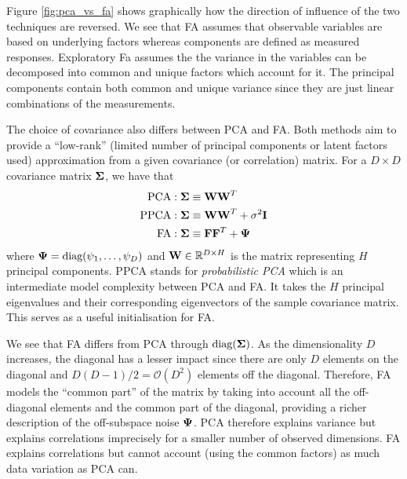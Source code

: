 \documentclass[12pt, letterpaper]{article}
\begin{document}
    Figure \ref{fig:pca_vs_fa} shows graphically how the direction of influence of the two techniques are reversed. We see that FA assumes that observable variables are based on underlying factors whereas components are defined as measured responses. 
    Exploratory Fa assumes the the variance in the variables can be decomposed into common and unique factors which account for it. The principal components contain both common and unique variance since they are just linear combinations of the measurements.

    The choice of covariance also differs between PCA and FA. Both methods aim to provide a ``low-rank'' (limited number of principal components or latent factors used) approximation from a given covariance (or correlation) matrix. For a $D\times D$ covariance matrix $\vb{\Sigma}$, we have that 
    \begin{align*}
        \text{PCA} &: \vb{\Sigma}\equiv \vb{WW}^T \\
        \text{PPCA} &: \vb{\Sigma}\equiv \vb{WW}^T + \sigma^2\vb{I} \\
        \text{FA} &: \vb{\Sigma}\equiv \vb{FF}^T+\vb{\Psi}
    \end{align*}
    where $\vb{\Psi}=\text{diag}(\psi_1,\dots,\psi_D)$ and $\vb{W}\in\mathbb{R}^{D\times H}$ is the matrix representing $H$ principal components. PPCA stands for \emph{probabilistic PCA} which is an intermediate model complexity between PCA and FA. It takes the $H$ principal eigenvalues and their corresponding eigenvectors of the sample covariance matrix. This serves as a useful initialisation for FA.
    
    We see that FA differs from PCA through $\text{diag}(\vb{\Sigma})$. As the dimensionality $D$ increases, the diagonal has a lesser impact since there are only $D$ elements on the diagonal and $D(D-1)/2 = \mathcal{O}(D^2)$ elements off the diagonal. Therefore, FA models the ``common part'' of the matrix by taking into account all the off-diagonal elements and the common part of the diagonal, providing a richer description of the off-subspace noise $\vb{\Psi}$. PCA therefore explains variance but explains correlations imprecisely for a smaller number of observed dimensions. FA explains correlations but cannot account (using the common factors) as much data variation as PCA can.
    
\end{document}
